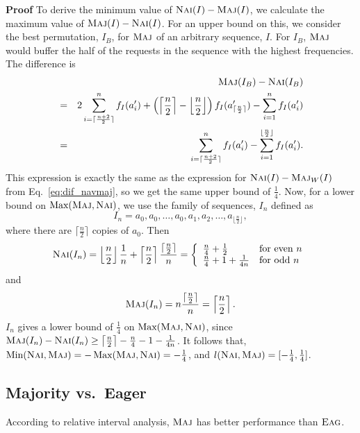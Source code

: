 \documentclass[11pt]{article}
\newenvironment{proof}{\begin{trivlist}\item[]{\bf Proof }}{\hspace*{\fill}\raisebox{-1pt}{\boldmath$\Box$}\end{trivlist}}
\newcommand{\maj}{{\ensuremath{\textsc{Maj}}}\xspace}
\newcommand{\nav}{{\ensuremath{\textsc{Nai}}}\xspace}
\newcommand{\eag}{{\ensuremath{\textsc{Eag}}}\xspace}
\DeclareMathOperator{\Max}{\textrm{Max}}
\DeclareMathOperator{\Min}{\textrm{Min}}
\begin{document}
\begin{proof}
To derive the minimum value of $\nav (I) - \maj (I)$,
we calculate the maximum value of $\maj (I) - \nav (I)$. For an upper
bound on this,
we consider the best permutation, $I_B$, for \maj of an arbitrary sequence, $I$.
For $I_B$, \maj would buffer the half of the requests in the sequence with 
the highest frequencies.
The difference is
\begin{eqnarray}&& \maj(I_B) - \nav(I_B) \nonumber\\
&=& 2  \sum_{i=\lceil \frac{n+2}{2} \rceil}^{n}   f_I(a'_i) + \left(\left\lceil \frac{n}{2} \right\rceil - \left\lfloor \frac{n}{2} \right\rfloor \right) f_I(a'_{\lceil \frac{n}{2} \rceil}) - \sum_{i=1}^n f_I(a'_i)  \nonumber\\
 &=& \sum_{i=\lceil \frac{n+2}{2}\rceil}^n f_I(a'_i) - \sum_{i=1}^{\lfloor\frac{n}{2}\rfloor}f_I(a'_i). \nonumber \end{eqnarray}
This expression is exactly the same as the expression for $\nav (I) - \maj_W(I)$ from Eq.~\ref{eq:dif_navmaj}, so we get the same upper bound of $\frac{1}{4}$.
Now, for a lower bound on $\Max(\maj,\nav)$, we use the family of sequences, $I_n$ defined as
$$I_n = a_0,a_0,\ldots,a_0,a_1,a_2,\ldots,a_{\lfloor\frac{n}{2}\rfloor},$$ where there
are $\lceil \frac{n}{2} \rceil$ copies of $a_0$. Then
\[
\nav(I_n) = \left\lfloor\frac{n}{2}\right\rfloor\frac{1}{n} + \left\lceil \frac{n}{2} \right\rceil \frac{\lceil\frac{n}{2}\rceil}{n}
= \left\{ \begin{array}{ll}
\frac{n}{4} + \frac{1}{2} & \mbox{for even $n$}\\
\frac{n}{4} + 1 + \frac{1}{4n} & \mbox{for odd $n$}
\end{array} \right.
\]
and
\[
\maj(I_n) = n\frac{\lceil\frac{n}{2}\rceil}{n}=\left\lceil\frac{n}{2}\right\rceil.\]
$I_n$ gives a lower
bound of $\frac{1}{4}$ on $\Max(\maj,\nav)$, since
$\maj(I_n)-\nav(I_n) \geq \left\lceil\frac{n}{2}\right\rceil-
\frac{n}{4} - 1 - \frac{1}{4n}$.
It follows that, $\Min(\nav, \maj)= -\Max(\maj, \nav) = -\frac{1}{4}$,
and $l(\nav, \maj) = [-\frac{1}{4}, \frac{1}{4}]$.
\end{proof}



\subsection{Majority vs.\ Eager}

According to relative interval analysis, \maj has better performance
than \eag.
\end{document}
